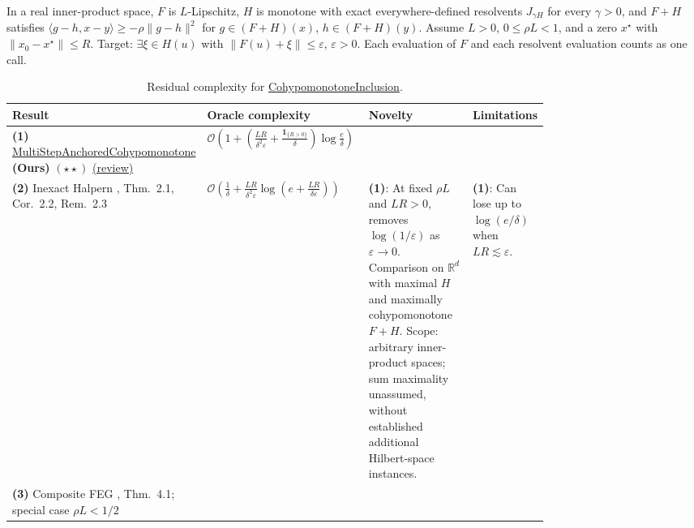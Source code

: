 \begin{table}[tp]
\centering
\caption{Residual complexity for \href{https://github.com/k3nfalt/longtails/blob/main/LongTails/Setups/CohypomonotoneInclusion.lean}{CohypomonotoneInclusion}.}\label{tab:CohypomonotoneInclusion}
\parbox{\linewidth}{\footnotesize In a real inner-product space, $F$ is $L$-Lipschitz, $H$ is monotone with exact everywhere-defined resolvents $J_{\gamma H}$ for every $\gamma>0$, and $F+H$ satisfies $\langle g-h,x-y\rangle\geq-\rho\|g-h\|^2$ for $g\in(F+H)(x)$, $h\in(F+H)(y)$. Assume $L>0$, $0\leq\rho L<1$, and a zero $x^\star$ with $\|x_0-x^\star\|\leq R$. Target: $\exists\xi\in H(u)$ with $\|F(u)+\xi\|\leq\varepsilon$, $\varepsilon>0$. Each evaluation of $F$ and each resolvent evaluation counts as one call.}\par\smallskip
\begin{threeparttable}
\footnotesize
\setlength{\tabcolsep}{4pt}\renewcommand{\arraystretch}{1.25}
\begin{tabularx}{\linewidth}{@{}>{\raggedright\arraybackslash}p{0.20\linewidth}>{\raggedright\arraybackslash}p{0.32\linewidth}>{\raggedright\arraybackslash}p{0.25\linewidth}>{\raggedright\arraybackslash}X@{}}
\toprule
\textbf{Result} & \textbf{Oracle complexity} & \textbf{Novelty} & \textbf{Limitations} \\
\midrule
\textbf{(1)} \href{https://github.com/k3nfalt/longtails/blob/main/LongTails/Theorems/MultiStepAnchoredCohypomonotone.lean}{Multi\allowbreak Step\allowbreak Anchored\allowbreak Cohypomonotone} \textbf{(Ours)} $(\star\star)$ \href{https://github.com/k3nfalt/longtails/blob/main/scripts/reviews/MultiStepAnchoredCohypomonotone.md}{(review)}
& $\mathcal{O}\!\left(1+\left(\frac{LR}{\delta^2\varepsilon}+\frac{\mathbf{1}_{\{R>0\}}}{\delta}\right)\log\frac{e}{\delta}\right)$
& & \\
\midrule[1.2pt]
\textbf{(2)} Inexact Halpern \citep{cohypAKWv3}, Thm.~2.1, Cor.~2.2, Rem.~2.3
& $\mathcal{O}\!\left(\frac{1}{\delta}+\frac{LR}{\delta^2\varepsilon}\log\!\left(e+\frac{LR}{\delta\varepsilon}\right)\right)$
& \textbf{(1)}: At fixed $\rho L$ and $LR>0$, removes $\log(1/\varepsilon)$ as $\varepsilon\to0$. Comparison on $\mathbb{R}^d$ with maximal $H$ and maximally cohypomonotone $F+H$. Scope: arbitrary inner-product spaces; sum maximality unassumed, without established additional Hilbert-space instances.
& \textbf{(1)}: Can lose up to $\log(e/\delta)$ when $LR\lesssim\varepsilon$. \\
\midrule
\textbf{(3)} Composite FEG \citep{cohypCOZv6}, Thm.~4.1; special case $\rho L<1/2$

\end{tabularx}
\end{threeparttable}
\end{table}
